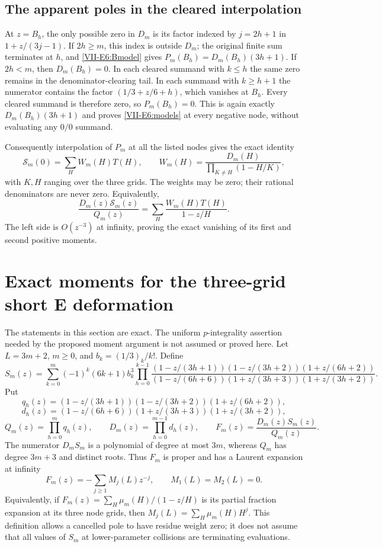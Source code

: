\documentclass[11pt,letterpaper]{article}
\numberwithin{equation}{section}
\begin{document}
\subsection{The apparent poles in the cleared interpolation}
At $z=B_h$, the only possible zero in $D_m$ is its factor indexed
by $j=2h+1$ in $1+z/(3j-1)$.
If $2h\ge m$, this index is outside $D_m$; the original finite
sum terminates at $h$, and \eqref{VII-E6:Bmodel} gives
$P_m(B_h)=D_m(B_h)(3h+1)$.
If $2h<m$, then $D_m(B_h)=0$. In each cleared summand with
$k\le h$ the same zero remains in the denominator-clearing tail.
In each summand with $k\ge h+1$ the numerator contains the factor
$(1/3+z/6+h)$, which vanishes at $B_h$.
Every cleared summand is therefore zero, so $P_m(B_h)=0$.
This is again exactly $D_m(B_h)(3h+1)$ and proves
\eqref{VII-E6:models} at every negative node, without evaluating any
$0/0$ summand.

Consequently interpolation of $P_m$ at all the listed nodes gives
the exact identity
\[
 \mathcal S_m(0)=\sum_H W_m(H)T(H),\qquad
 W_m(H)=\frac{D_m(H)}{\prod_{K\ne H}(1-H/K)},
\]
with $K,H$ ranging over the three grids. The weights may be zero;
their rational denominators are never zero.
Equivalently,
\[
 \frac{D_m(z)\mathcal S_m(z)}{Q_m(z)}
 =\sum_H\frac{W_m(H)T(H)}{1-z/H}.
\]
The left side is $O(z^{-3})$ at infinity, proving the exact
vanishing of its first and second positive moments.

\section{Exact moments for the three-grid short E deformation}\label{loc-VII-3}
\label{VII-sec:e-three-grid-moments}
The statements in this section are exact. The uniform $p$-integrality
assertion needed by the proposed moment argument is not assumed or
proved here.
Let $L=3m+2$, $m\ge0$, and $b_k=(1/3)_k/k!$. Define
\[
 S_m(z)=\sum_{k=0}^m(-1)^k(6k+1)b_k^3
 \prod_{h=0}^{k-1}
 \frac{(1-z/(3h+1))(1-z/(3h+2))(1+z/(6h+2))}
 {(1-z/(6h+6))(1+z/(3h+3))(1+z/(3h+2))}.
\]
Put
\[
 q_h(z)=(1-z/(3h+1))(1-z/(3h+2))(1+z/(6h+2)),
\]
\[
 d_h(z)=(1-z/(6h+6))(1+z/(3h+3))(1+z/(3h+2)),
\]
\[
 Q_m(z)=\prod_{h=0}^m q_h(z),\qquad
 D_m(z)=\prod_{h=0}^{m-1}d_h(z),\qquad
 F_m(z)=\frac{D_m(z)S_m(z)}{Q_m(z)}.
\]
The numerator $D_mS_m$ is a polynomial of degree at most $3m$,
whereas $Q_m$ has degree $3m+3$ and distinct roots. Thus $F_m$ is
proper and has a Laurent expansion at infinity
\[
 F_m(z)=-\sum_{j\ge1}M_j(L)z^{-j},\qquad M_1(L)=M_2(L)=0.
\]
Equivalently, if $F_m(z)=\sum_H\mu_m(H)/(1-z/H)$ is its partial
fraction expansion at its three node grids, then
$M_j(L)=\sum_H\mu_m(H)H^j$. This definition allows a cancelled pole
to have residue weight zero; it does not assume that all values of
$S_m$ at lower-parameter collisions are terminating evaluations.
\end{document}
